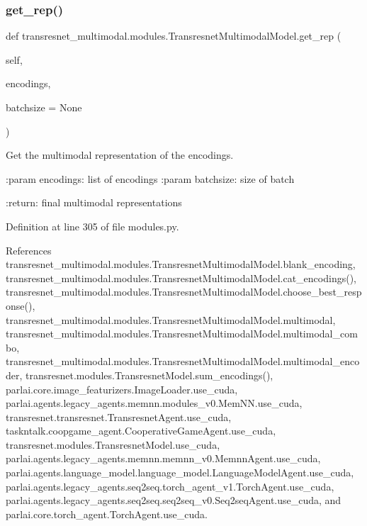 \subsubsection{\texorpdfstring{get\+\_\+rep()}{get\_rep()}}
{\footnotesize\ttfamily def transresnet\+\_\+multimodal.\+modules.\+Transresnet\+Multimodal\+Model.\+get\+\_\+rep (\begin{DoxyParamCaption}\item[{}]{self,  }\item[{}]{encodings,  }\item[{}]{batchsize = {\ttfamily None} }\end{DoxyParamCaption})}

\begin{DoxyVerb}Get the multimodal representation of the encodings.

:param encodings:
    list of encodings
:param batchsize:
    size of batch

:return:
    final multimodal representations
\end{DoxyVerb}
 

Definition at line 305 of file modules.\+py.



References transresnet\+\_\+multimodal.\+modules.\+Transresnet\+Multimodal\+Model.\+blank\+\_\+encoding, transresnet\+\_\+multimodal.\+modules.\+Transresnet\+Multimodal\+Model.\+cat\+\_\+encodings(), transresnet\+\_\+multimodal.\+modules.\+Transresnet\+Multimodal\+Model.\+choose\+\_\+best\+\_\+response(), transresnet\+\_\+multimodal.\+modules.\+Transresnet\+Multimodal\+Model.\+multimodal, transresnet\+\_\+multimodal.\+modules.\+Transresnet\+Multimodal\+Model.\+multimodal\+\_\+combo, transresnet\+\_\+multimodal.\+modules.\+Transresnet\+Multimodal\+Model.\+multimodal\+\_\+encoder, transresnet.\+modules.\+Transresnet\+Model.\+sum\+\_\+encodings(), parlai.\+core.\+image\+\_\+featurizers.\+Image\+Loader.\+use\+\_\+cuda, parlai.\+agents.\+legacy\+\_\+agents.\+memnn.\+modules\+\_\+v0.\+Mem\+N\+N.\+use\+\_\+cuda, transresnet.\+transresnet.\+Transresnet\+Agent.\+use\+\_\+cuda, taskntalk.\+coopgame\+\_\+agent.\+Cooperative\+Game\+Agent.\+use\+\_\+cuda, transresnet.\+modules.\+Transresnet\+Model.\+use\+\_\+cuda, parlai.\+agents.\+legacy\+\_\+agents.\+memnn.\+memnn\+\_\+v0.\+Memnn\+Agent.\+use\+\_\+cuda, parlai.\+agents.\+language\+\_\+model.\+language\+\_\+model.\+Language\+Model\+Agent.\+use\+\_\+cuda, parlai.\+agents.\+legacy\+\_\+agents.\+seq2seq.\+torch\+\_\+agent\+\_\+v1.\+Torch\+Agent.\+use\+\_\+cuda, parlai.\+agents.\+legacy\+\_\+agents.\+seq2seq.\+seq2seq\+\_\+v0.\+Seq2seq\+Agent.\+use\+\_\+cuda, and parlai.\+core.\+torch\+\_\+agent.\+Torch\+Agent.\+use\+\_\+cuda.



